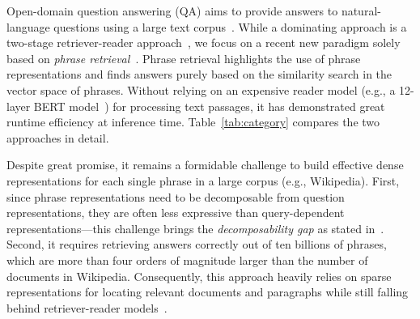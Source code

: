 \documentclass[11pt,a4paper]{article}
\begin{document}
Open-domain question answering (QA) aims to provide answers to natural-language questions using a large text corpus~\citep{voorhees1999trec,ferrucci2010building,chen2020open}.
While a dominating approach is a two-stage retriever-reader approach~\citep{chen2017reading,lee2019latent,guu2020realm,karpukhin2020dense},
we focus on a recent new paradigm solely based on \textit{phrase retrieval}~\citep{seo2018phrase,seo2019real,lee2020contextualized}.
Phrase retrieval highlights the use of phrase representations and finds answers purely based on the similarity search in the vector space of phrases.
Without relying on an expensive reader model (e.g., a 12-layer BERT model~\cite{devlin2019bert}) for processing text passages, it has demonstrated great runtime efficiency at inference time.
Table~\ref{tab:category} compares the two approaches in detail.









Despite great promise, it remains a formidable challenge to build effective dense representations for each single phrase in a large corpus (e.g., Wikipedia). First, since phrase representations need to be decomposable from question representations, they are often less expressive than query-dependent representations---this challenge brings the \textit{decomposability gap} as stated in~\citep{seo2018phrase,seo2019real}.
Second, it requires retrieving answers correctly out of {ten billions} of phrases, which are more than four orders of magnitude larger than the number of documents in Wikipedia.
Consequently, this approach heavily relies on sparse representations for locating relevant documents and paragraphs while still falling behind retriever-reader models~\citep{seo2019real,lee2020contextualized}.
\end{document}

